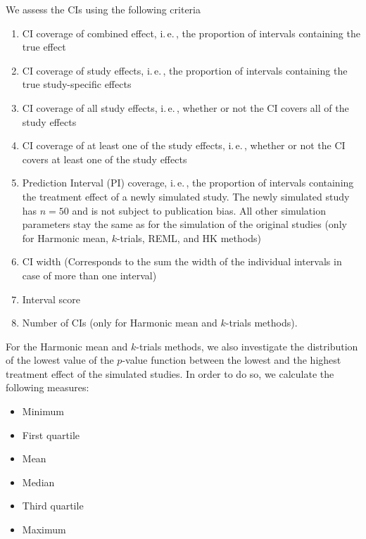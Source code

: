 \documentclass[letterpaper, 12pt]{article}
\newcommand{\ie}{{i.\,e.\,}}
\begin{document}
We assess the CIs using the following criteria
\begin{enumerate}
  \item CI coverage of combined effect, \ie, the proportion of intervals
    containing the true effect %
  \item CI coverage of study effects, \ie, the proportion of intervals
    containing the true study-specific effects %
  \item CI coverage of all study effects, \ie, whether or not the CI covers
    all of the study effects %
  \item CI coverage of at least one of the study effects, \ie, whether or not
    the CI covers at least one of the study effects %
  \item Prediction Interval (PI) coverage, \ie, the proportion of intervals
    containing the treatment effect of a newly simulated study. The newly
    simulated study has $n = 50$ and is not subject to publication bias. All
    other simulation parameters stay the same as for the simulation of the
    original studies (only for Harmonic mean, $k$-trials, REML, and HK methods)
  \item CI width (Corresponds to the sum the width of the individual intervals
    in case of more than one interval)%
  \item Interval score \citep{Gnei:Raft:07} %
  \item Number of CIs (only for Harmonic mean and $k$-trials methods). %
\end{enumerate}

\vspace*{.5cm}

For the Harmonic mean and $k$-trials methods, we also investigate the
distribution of the lowest value of the $p$-value function between the lowest
and the highest treatment effect of the simulated studies. In order to do so,
we calculate the following measures:
\begin{itemize}
\item Minimum
\item First quartile
\item Mean
\item Median
\item Third quartile
\item Maximum
\end{itemize}

\vspace*{.5cm}
\end{document}
